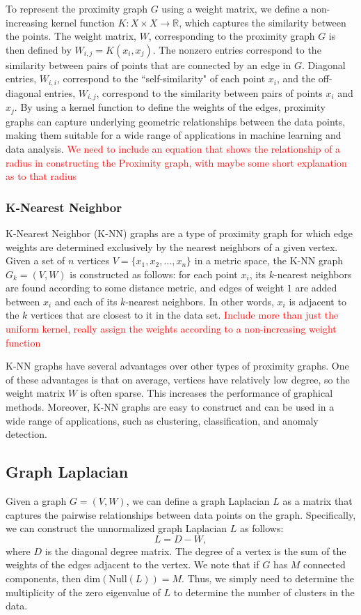\documentclass[12pt]{amsart}
\begin{document}
To represent the proximity graph $G$ using a weight matrix, we define a non-increasing kernel function $K\colon X \times X \rightarrow \mathbb{R}$, which captures the similarity between the points. The weight matrix, $W$, corresponding to the proximity graph $G$ is then defined by $W_{i,j} = K(x_i,x_j)$. The nonzero entries correspond to the similarity between pairs of points that are connected by an edge in $G$. Diagonal entries, $W_{i,i}$, correspond to the ``self-similarity" of each point $x_i$, and the off-diagonal entries, $W_{i,j}$, correspond to the similarity between pairs of points $x_i$ and $x_j$. By using a kernel function to define the weights of the edges, proximity graphs can capture underlying geometric relationships between the data points, making them suitable for a wide range of applications in machine learning and data analysis.
\textcolor{red}{We need to include an equation that shows the relationship of a radius in constructing the Proximity graph, with maybe some short explanation as to that radius}
\subsubsection{K-Nearest Neighbor}
K-Nearest Neighbor (K-NN) graphs are a type of proximity graph for which edge weights are determined exclusively by the nearest neighbors of a given vertex. Given a set of $n$ vertices $V = \{x_1, x_2, ..., x_n\}$ in a metric space, the K-NN graph $G_k = (V, W)$ is constructed as follows: for each point $x_i$, its $k$-nearest neighbors are found according to some distance metric, and edges of weight $1$ are added between $x_i$ and each of its $k$-nearest neighbors. In other words, $x_i$ is adjacent to the $k$ vertices that are closest to it in the data set.
\textcolor{red}{Include more than just the uniform kernel, really assign the weights according to a non-increasing weight function}

K-NN graphs have several advantages over other types of proximity graphs. One of these advantages is that on average, vertices have relatively low degree, so the weight matrix $W$ is often sparse. This increases the performance of graphical methods. Moreover, K-NN graphs are easy to construct and can be used in a wide range of applications, such as clustering, classification, and anomaly detection.

\subsection{Graph Laplacian}
Given a graph $G = (V, W)$, we can define a graph Laplacian $L$ as a matrix that captures the pairwise relationships between data points on the graph. Specifically, we can construct the unnormalized graph Laplacian $L$ as follows:
$$ L = D - W, $$
where $D$ is the diagonal degree matrix. The degree of a vertex is the sum of the weights of the edges adjacent to the vertex. We note that if $G$ has $M$ connected components, then $\mathrm{dim}(\mathrm{Null}(L))=M$. Thus, we simply need to determine the multiplicity of the zero eigenvalue of $L$ to determine the number of clusters in the data.
\end{document}
